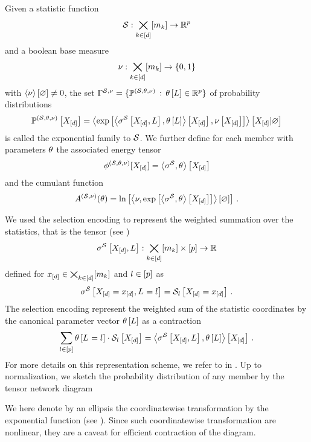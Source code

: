 \begin{definition}
    \label{def:expFamily}
    Given a statistic function
    \begin{align*}
        \mathcal{S} : \bigtimes_{k\in[d]}[m_{k}] \rightarrow \mathbb{R}^{p}
    \end{align*}
    and a boolean base measure
    \begin{align*}
        \nu : \bigtimes_{k\in[d]}[m_{k}] \rightarrow \{0,1\}
    \end{align*}
    with $\left\langle \nu\right\rangle \left[ \varnothing \right]\neq0$, the set $\Gamma^{\mathcal{S},\nu}=\{\mathbb{P}^{(\mathcal{S},\theta,\nu)} \, : \, \theta\left[L\right]\in\mathbb{R}^{p}\}$ of probability distributions
    \begin{align*}
        \mathbb{P}^{(\mathcal{S},\theta,\nu)}\left[X_{[d]}\right] = \left\langle \mathrm{exp}\left[\left\langle \sigma^{\mathcal{S}}\left[X_{[d]},L\right],\theta\left[L\right]\right\rangle \left[ X_{[d]} \right],\nu\left[X_{[d]}\right]\right]\right\rangle \left[ X_{[d]} | \varnothing \right]
    \end{align*}
    is called the exponential family to $\mathcal{S}$.
    We further define for each member with parameters $\theta$ the associated energy tensor
    \begin{align*}
        \phi^{(\mathcal{S},\theta,\nu)}[X_{[d]}] = \left\langle \sigma^{\mathcal{S}},\theta\right\rangle \left[ X_{[d]} \right]
    \end{align*}
    and the cumulant function
    \[ A^{(\mathcal{S},\nu)}(\theta) = \ln \left[ \left\langle \nu,\mathrm{exp}\left[\left\langle \sigma^{\mathcal{S}},\theta\right\rangle \left[ X_{[d]} \right] \right]\right\rangle \left[ \varnothing \right]  \right] \, .\]
\end{definition}


We used the selection encoding to represent the weighted summation over the statistics, that is the tensor (see )
\begin{align*}
    \sigma^{\mathcal{S}}\left[X_{[d]},L\right]: \bigtimes_{k\in[d]}[m_{k}] \times [p] \rightarrow \mathbb{R}
\end{align*}
defined for $x_{[d]}\in\bigtimes_{k\in[d]}[m_{k}]$ and $l\in[p]$ as
\begin{align*}
    \sigma^{\mathcal{S}}\left[X_{[d]}=x_{[d]},L_{}=l_{}\right] = \mathcal{S}_{l}\left[X_{[d]}=x_{[d]}\right] \, .
\end{align*}
The selection encoding represent the weighted sum of the statistic coordinates by the canonical parameter vector $\theta\left[L\right]$ as a contraction
\begin{align*}
    \sum_{l\in[p]}\theta\left[L_{}=l_{}\right]\cdot \mathcal{S}_{l}\left[X_{[d]}\right]
    = \left\langle \sigma^{\mathcal{S}}\left[X_{[d]},L\right],\theta\left[L\right]\right\rangle \left[ X_{[d]} \right] \, .
\end{align*}
For more details on this representation scheme, we refer to  in .
Up to normalization, we sketch the probability distribution of any member by the tensor network diagram
\begin{center}
    
\end{center}
We here denote by an ellipsis the coordinatewise transformation by the exponential function (see ).
Since such coordinatewise transformation are nonlinear, they are a caveat for efficient contraction of the diagram.

